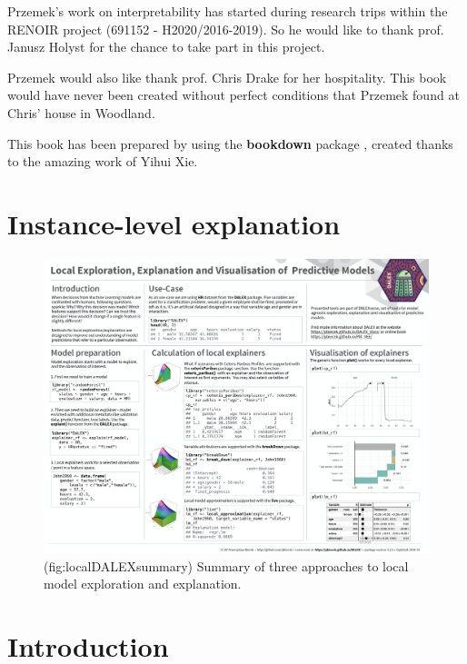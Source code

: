 \documentclass[]{krantz}
\theoremstyle{definition}
\theoremstyle{definition}
\theoremstyle{definition}
\theoremstyle{remark}
\begin{document}
Przemek's work on interpretability has started during research trips
within the RENOIR project (691152 - H2020/2016-2019). So he would like
to thank prof. Janusz Holyst for the chance to take part in this
project.

Przemek would also like thank prof. Chris Drake for her hospitality.
This book would have never been created without perfect conditions that
Przemek found at Chris' house in Woodland.

This book has been prepared by using the \textbf{bookdown} package
\citep{R-bookdown}, created thanks to the amazing work of Yihui Xie.

\hypertarget{instance-level-explanation}{%
\section*{Instance-level explanation}\label{instance-level-explanation}}

\begin{figure}

{\centering \includegraphics[width=0.99\linewidth]{figure/DALEX_local} 

}

\caption{(fig:localDALEXsummary) Summary of three approaches to local model exploration and explanation.}\label{fig:localDALEXsummary}
\end{figure}

\hypertarget{PredictionExplainers}{%
\section{Introduction}\label{PredictionExplainers}}
\end{document}
